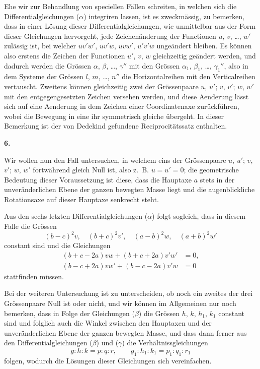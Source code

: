 \documentclass[12pt,a4paper]{book}
\theoremstyle{definition}
\theoremstyle{remark}
\begin{document}
Ehe wir zur Behandlung von speciellen F\"allen schreiten, in welchen sich die Differentialgleichungen ($\alpha$) integriren lassen, ist es zweckm\"assig, zu bemerken, dass in einer L\"osung dieser Differentialgleichungen, wie unmittelbar aus der Form dieser Gleichungen hervorgeht, jede Zeichen\"anderung der Functionen $u$, $v$, \dots, $w'$ zul\"assig ist, bei welcher $uv'w'$, $uv'w$, $uvw'$, $u'v'w$ unge\"andert bleiben. Es k\"onnen also erstens die Zeichen der Functionen $u'$, $v$, $w$ gleichzeitig ge\"andert werden, und dadurch werden die Gr\"ossen $\alpha$, $\beta$, \dots, $\gamma''$ mit den Gr\"ossen $\alpha_{1}$, $\beta_{1}$, \dots, $\gamma_{1}''$, also in dem Systeme der Gr\"ossen $l$, $m$, \dots, $n''$ die Horizontalreihen mit den Verticalreihen vertauscht. Zweitens k\"onnen gleichzeitig zwei der Gr\"ossenpaare $u$, $u'$; $v$, $v'$; $w$, $w'$ mit den entgegengesetzten Zeichen versehen werden, und diese Aenderung l\"asst sich auf eine Aenderung in dem Zeichen einer Coordinatenaxe zur\"uckf\"uhren, wobei die Bewegung in eine ihr symmetrisch gleiche \"ubergeht. In dieser Bemerkung ist der von Dedekind gefundene Reciprocit\"atssatz enthalten.

\begin{center}
\textbf{6.}
\end{center}

Wir wollen nun den Fall untersuchen, in welchem eins der Gr\"ossenpaare $u$, $u'$; $v$, $v'$; $w$, $w'$ fortw\"ahrend gleich Null ist, also z.~B. $u = u' = 0$; die geometrische Bedeutung dieser Voraussetzung ist diese, dass die Hauptaxe $a$ stets in der unver\"anderlichen Ebene der ganzen bewegten Masse liegt und die augenblickliche Rotationsaxe auf dieser Hauptaxe senkrecht steht.

Aus den sechs letzten Differentialgleichungen ($\alpha$) folgt sogleich, dass in diesem Falle die Gr\"ossen
\begin{equation*}
(b - c)^{2}v,\quad (b + c)^{2}v',\quad (a - b)^{2}w,\quad (a + b)^{2}w'\tag{$\beta$}
\end{equation*}
constant sind und die Gleichungen
\begin{align*}
(b + c - 2a)vw + (b + c + 2a)v'w' &= 0,\\
(b - c + 2a)vw' + (b - c - 2a)v'w &= 0\tag{$\gamma$}
\end{align*}
stattfinden m\"ussen.

Bei der weiteren Untersuchung ist zu unterscheiden, ob noch ein zweites der drei Gr\"ossenpaare Null ist oder nicht, und wir k\"onnen im Allgemeinen nur noch bemerken, dass in Folge der Gleichungen ($\beta$) die Gr\"ossen $h$, $k$, $h_{1}$, $k_{1}$ constant sind und folglich auch die Winkel zwischen den Hauptaxen und der unver\"anderlichen Ebene der ganzen bewegten Masse, und dass dann ferner aus den Differentialgleichungen ($\beta$) und ($\gamma$) die Verh\"altnissgleichungen
\[
g : h : k = p : q : r,\qquad g_{1} : h_{1} : k_{1} = p_{1} : q_{1} : r_{1}
\]
folgen, wodurch die L\"osungen dieser Gleichungen sich vereinfachen.
\end{document}
